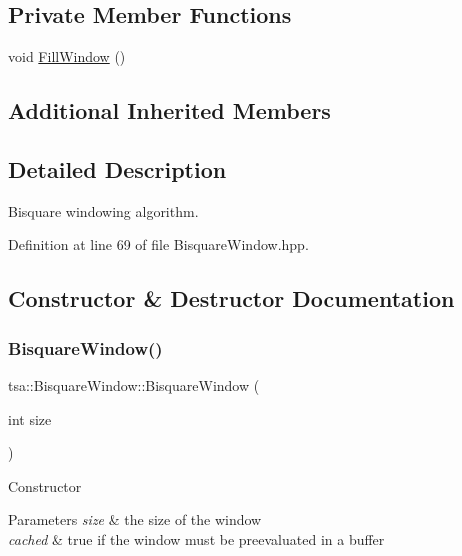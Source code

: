 \subsection*{Private Member Functions}
\begin{DoxyCompactItemize}
\item 
void \hyperlink{classtsa_1_1_bisquare_window_a62ab3bab83dd4dd77090c7c49be24acb}{Fill\+Window} ()
\end{DoxyCompactItemize}
\subsection*{Additional Inherited Members}


\subsection{Detailed Description}
Bisquare windowing algorithm. 

Definition at line 69 of file Bisquare\+Window.\+hpp.



\subsection{Constructor \& Destructor Documentation}
\mbox{\label{classtsa_1_1_bisquare_window_a6e5d4dbf8578ed2e9b516d9410c91156}} 
\subsubsection{\texorpdfstring{Bisquare\+Window()}{BisquareWindow()}\hspace{0.1cm}{\footnotesize\ttfamily [1/2]}}
{\footnotesize\ttfamily tsa\+::\+Bisquare\+Window\+::\+Bisquare\+Window (\begin{DoxyParamCaption}\item[{int}]{size }\end{DoxyParamCaption})\hspace{0.3cm}{\ttfamily [inline]}}

Constructor


\begin{DoxyParams}{Parameters}
{\em size} & the size of the window \\
\hline
{\em cached} & true if the window must be preevaluated in a buffer \\
\hline
\end{DoxyParams}



